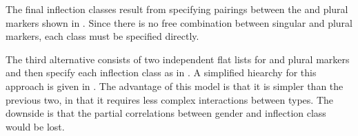 \begin{figure}
{}
\end{figure}

The final inflection classes result from specifying pairings between the  and plural markers shown in . Since there is no free combination between singular and plural markers, each class must be specified directly.

\largerpage 
The third alternative consists of two independent flat lists for  and plural markers and then specify each inflection class as in . A simplified hiearchy for this approach is given in . The advantage of this model is that it is simpler than the previous two, in that it requires less complex interactions between types. The downside is that the partial correlations between gender and inflection class would be lost.

